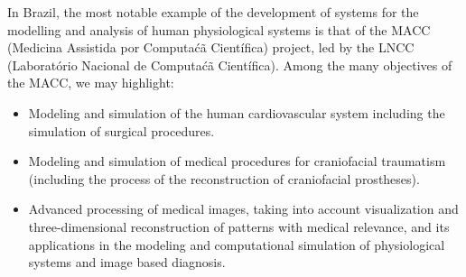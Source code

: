 In Brazil, the most notable example of the development of systems for the modelling and analysis of human physiological systems is that of the MACC (Medicina Assistida por Computa\'c\~a Cient\'ifica) project, led by the LNCC (Laborat\'orio Nacional de Computa\'c\~a Cient\'ifica). Among the many objectives of the MACC, we may highlight: 

\begin{itemize}
\item Modeling and simulation of the human cardiovascular system including the simulation of surgical procedures.
\item Modeling and simulation of medical procedures for craniofacial traumatism (including the process of the reconstruction of craniofacial prostheses).
\item Advanced processing of medical images, taking into account visualization and three-dimensional reconstruction of patterns with medical relevance, and its applications in the modeling and computational simulation of physiological systems and image based diagnosis.
\end{itemize}



